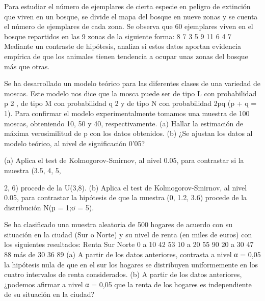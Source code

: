 \begin{problem}[5] Para estudiar el número de ejemplares de cierta especie en peligro de extinción que viven en un
bosque, se divide el mapa del bosque en nueve zonas y se cuenta el número de ejemplares de cada
zona. Se observa que 60 ejemplares viven en el bosque repartidos en las 9 zonas de la siguiente
forma:
8 7 3
5 9 11
6 4 7
Mediante un contraste de hipótesis, analiza si estos datos aportan evidencia empírica de que los
animales tienen tendencia a ocupar unas zonas del bosque más que otras.
\solution

\end{problem}
\begin{problem}[6] Se ha desarrollado un modelo teórico para las diferentes clases de una variedad de moscas. Este
modelo nos dice que la mosca puede ser de tipo L con probabilidad p
2
, de tipo M con probabilidad
q
2 y de tipo N con probabilidad 2pq (p + q = 1). Para confirmar el modelo experimentalmente
tomamos una muestra de 100 moscas, obteniendo 10, 50 y 40, respectivamente.
(a) Hallar la estimación de máxima verosimilitud de p con los datos obtenidos.
(b) ¿Se ajustan los datos al modelo teórico, al nivel de significación 0’05?
\solution

\end{problem}
\begin{problem}[7] (a) Aplica el test de Kolmogorov-Smirnov, al nivel 0.05, para contrastar si la muestra (3.5, 4, 5,
\solution

\end{problem}
\begin{problem}[5]2, 6) procede de la U(3,8).
(b) Aplica el test de Kolmogorov-Smirnov, al nivel 0.05, para contrastar la hipótesis de que la
muestra (0, 1.2, 3.6) procede de la distribución N(µ = 1;σ = 5).
\solution

\end{problem}
\begin{problem}[8] Se ha clasificado una muestra aleatoria de 500 hogares de acuerdo con su situación en la ciudad
(Sur o Norte) y su nivel de renta (en miles de euros) con los siguientes resultados:
Renta Sur Norte
0 a 10 42 53
10 a 20 55 90
20 a 30 47 88
más de 30 36 89
(a) A partir de los datos anteriores, contrasta a nivel α = 0,05 la hipótesis nula de que en el sur los
hogares se distribuyen uniformemente en los cuatro intervalos de renta considerados.
(b) A partir de los datos anteriores, ¿podemos afirmar a nivel α = 0,05 que la renta de los hogares
es independiente de su situación en la ciudad?
\solution

\end{problem}
